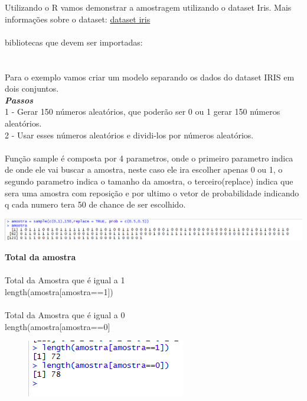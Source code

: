 Utilizando o R vamos demonstrar a amostragem utilizando o dataset Iris.
Mais informações sobre o dataset: \href{https://en.wikipedia.org/wiki/Iris_flower_data_set}{dataset iris}
\\\\bibliotecas que devem ser importadas:
\\
\\\\Para o exemplo vamos criar um modelo separando os dados do dataset IRIS em dois conjuntos.
\textbf{\textit{\\Passos}}
\\1 - Gerar 150 números aleatórios, que poderão ser 0 ou 1 gerar 150 números aleatórios.
\\2 - Usar esses números aleatórios e dividi-los por números aleatórios.
\\\\Função sample é composta por 4 parametros, onde o primeiro parametro indica de onde ele vai buscar a amostra, 
neste caso ele ira escolher apenas 0 ou 1, o segundo parametro indica o tamanho da amostra, o terceiro(replace) 
indica que sera uma amostra com reposição e por ultimo o vetor de probabilidade indicando q cada numero tera 50%
de chance de ser escolhido.
\\

{\centering \includegraphics[scale=0.50]{cap1/Amostragem/AleatoriaSimplesR.png} \par}

\newpage
\textbf{Total da amostra}
\\\\Total da Amostra que é igual a 1
\\length(amostra[amostra==1])
\\\\Total da Amostra que é igual a 0
\\length(amostra[amostra==0]
\\

	\begin{figure}[h!]
    \includegraphics[scale=1.0]{cap1/Amostragem/AleatoriaSimplesRAmostraLength.png} 
	\end{figure}



